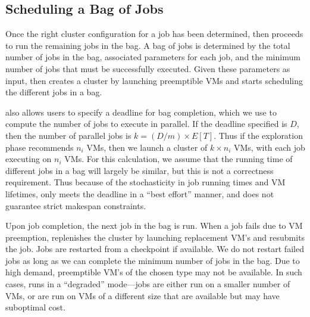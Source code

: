 
\subsection{Scheduling a Bag of Jobs}


Once the right cluster configuration for a job has been determined, \sysname then proceeds to run the remaining jobs in the bag.
A bag of jobs is determined by the total number of jobs in the bag, associated parameters for each job, and the minimum number of jobs that must be successfully executed.  
Given these parameters as input, \sysname then creates a cluster by launching preemptible VMs and starts scheduling the different jobs in a bag.

\sysname also allows users to specify a deadline for bag completion, which we use to compute the number of jobs to execute in parallel. If the deadline specified is $D$, then the number of parallel jobs is $k=(D/m)\times E[T]$. Thus if the exploration phase recommends $n_i$ VMs, then we launch a cluster of $k\times n_i$ VMs, with each job executing on $n_i$ VMs. 
For this calculation, we assume that the running time of different jobs in a bag will largely be similar, but this is not a correctness requirement.
Thus because of the stochasticity in job running times and VM lifetimes, \sysname only meets the deadline in a ``best effort'' manner, and does not guarantee strict makespan constraints. 

Upon job completion, the next job in the bag is run. 
When a job fails due to VM preemption, \sysname replenishes the cluster by launching replacement VM's and resubmits the job. 
Jobs are restarted from a checkpoint if available.
We do not restart failed jobs as long as we can complete the minimum number of jobs in the bag.
Due to high demand, preemptible VM's of the chosen type may not be available.
In such cases, \sysname runs in a ``degraded'' mode---jobs are either run on a smaller number of VMs, or are run on VMs of a different size that are available but may have suboptimal cost.  








